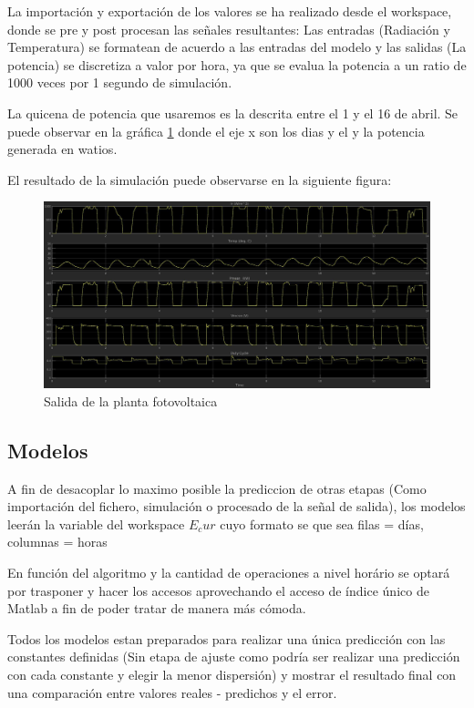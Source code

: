 La importación y exportación de los valores se ha realizado desde el workspace, donde se pre y post procesan las señales resultantes: Las entradas (Radiación y Temperatura) se formatean de acuerdo a las entradas del modelo y las salidas (La potencia) se discretiza a valor por hora, ya que se evalua la potencia a un ratio de 1000 veces por 1 segundo de simulación.

La quicena de potencia que usaremos es la descrita entre el 1 y el 16 de abril. Se puede observar en la gráfica \ref{fig:Ppv_output} donde el eje x son los dias y el y la potencia generada en watios.

El resultado de la simulación puede observarse en la siguiente figura:

\begin{figure}[h]
    \includegraphics[width=\textwidth]{Model_cur_outputs_010417.jpg}
    \caption{Salida de la planta fotovoltaica}
    \label{fig:Ppv_output}
\end{figure}


\subsection{Modelos}

A fin de desacoplar lo maximo posible la prediccion de otras etapas (Como importación del fichero, simulación o procesado de la señal de salida), los modelos leerán la variable del workspace $E_cur$ cuyo formato se que sea filas = días, columnas = horas

En función del algoritmo y la cantidad de operaciones a nivel horário se optará por trasponer y hacer los accesos aprovechando el acceso de índice único de Matlab a fin de poder tratar de manera más cómoda.

Todos los modelos estan preparados para realizar una única predicción con las constantes definidas (Sin etapa de ajuste como podría ser realizar una predicción con cada constante y elegir la menor dispersión) y mostrar el resultado final con una comparación entre valores reales - predichos y el error.

